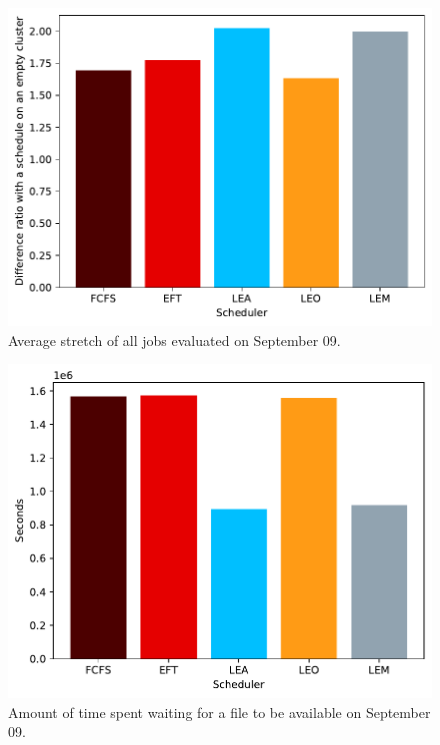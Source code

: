 \documentclass[conference,10pt]{IEEEtran}
\begin{document}
\begin{figure}[tb]\centering\includegraphics[scale=0.47]{../MBSS/plot/Results_FCFS_Score_Backfill_2022-09-09->2022-09-09_V10000_Mean_Stretch_450_128_32_256_4_1024.pdf}\caption{Average stretch of all jobs evaluated on September 09.}\end{figure}
\begin{figure}[tb]\centering\includegraphics[scale=0.47]{../MBSS/plot/Results_FCFS_Score_Backfill_2022-09-09->2022-09-09_V10000_Total_waiting_for_a_load_time_and_transfer_time_450_128_32_256_4_1024.pdf}\caption{Amount of time spent waiting for a file to be available on September 09.}\end{figure}
\end{document}
